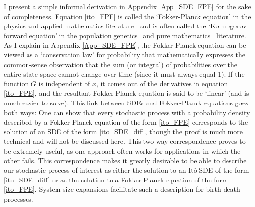 I present a simple informal derivation in Appendix \ref{App_SDE_FPE} for the sake of completeness. Equation \eqref{ito_FPE} is called the `Fokker-Planck equation' in the physics and applied mathematics literature~\citep{gardiner_stochastic_2009} and is often called the `Kolmogorov forward equation' in the population genetics~\citep{ewens_mathematical_2004} and pure mathematics~\citep{oksendal_stochastic_1998} literature. As I explain in Appendix \ref{App_SDE_FPE}, the Fokker-Planck equation can be viewed as a `conservation law' for probability that mathematically expresses the common-sense observation that the sum (or integral) of probabilities over the entire state space cannot change over time (since it must always equal 1). If the function $G$ is independent of $x$, it comes out of the derivatives in equation \eqref{ito_FPE}, and the resultant Fokker-Planck equation is said to be `linear' (and is much easier to solve). This link between SDEs and Fokker-Planck equations goes both ways: One can show that every stochastic process with a probability density described by a Fokker-Planck equation of the form \eqref{ito_FPE} corresponds to the solution of an SDE of the form \eqref{ito_SDE_diff}, though the proof is much more technical and will not be discussed here. This two-way correspondence proves to be extremely useful, as one approach often works for applications in which the other fails. This correspondence makes it greatly desirable to be able to describe our stochastic process of interest as either the solution to an It\^o SDE of the form \eqref{ito_SDE_diff} or as the solution to a Fokker-Planck equation of the form \eqref{ito_FPE}. System-size expansions facilitate such a description for birth-death processes.

